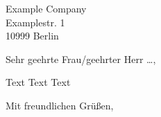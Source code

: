 \documentclass[
  letter,
  paper=a4,
  version=last,
  fontsize=11pt,
  DIV=13,
  BCOR=0mm,
  parskip=full,
]{scrlttr2}
\begin{document}

\begin{letter}{
  Example Company \\
  Examplestr. 1 \\
  10999 Berlin
}

\opening{Sehr geehrte Frau/geehrter Herr …,}

Text Text Text

\closing{Mit freundlichen Grüßen,}


\end{letter}
\end{document}

